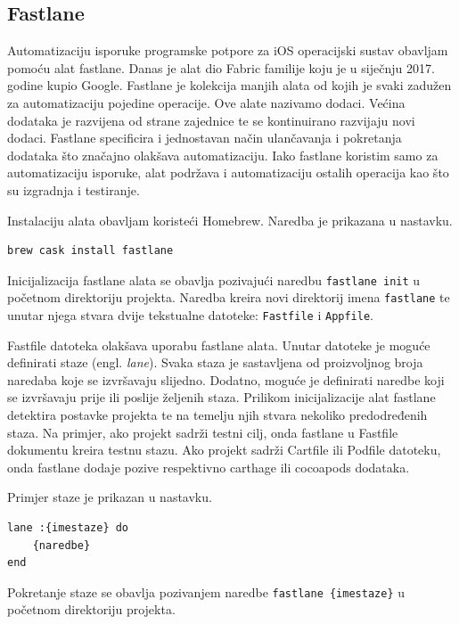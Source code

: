 \documentclass[times, utf8, diplomski, numeric]{fer}
\newcommand{\eng}[1]{(engl. \textit{#1})}
\begin{document}
\begin{appendices}
\chapter{Fastlane} \label{header:dodatak_fastlane}

Automatizaciju isporuke programske potpore za iOS operacijski sustav obavljam pomoću alat fastlane. Danas je alat dio Fabric familije koju je u siječnju 2017. godine kupio Google. Fastlane je kolekcija manjih alata od kojih je svaki zadužen za automatizaciju pojedine operacije. Ove alate nazivamo dodaci. Većina dodataka je razvijena od strane zajednice te se kontinuirano razvijaju novi dodaci. Fastlane specificira i jednostavan način ulančavanja i pokretanja dodataka što značajno olakšava automatizaciju. Iako fastlane koristim samo za automatizaciju isporuke, alat podržava i automatizaciju ostalih operacija kao što su izgradnja i testiranje\citep{fastlane}.

Instalaciju alata obavljam koristeći Homebrew. Naredba je prikazana u nastavku.

\begin{verbatim}
brew cask install fastlane
\end{verbatim}

Inicijalizacija fastlane alata se obavlja pozivajući naredbu \verb|fastlane init| u početnom direktoriju projekta. Naredba kreira novi direktorij imena \verb|fastlane| te unutar njega stvara dvije tekstualne datoteke: \verb|Fastfile| i \verb|Appfile|.

Fastfile datoteka olakšava uporabu fastlane alata. Unutar datoteke je moguće definirati staze \eng{lane}. Svaka staza je sastavljena od proizvoljnog broja naredaba koje se izvršavaju slijedno. Dodatno, moguće je definirati naredbe koji se izvršavaju prije ili poslije željenih staza. Prilikom inicijalizacije alat fastlane detektira postavke projekta te na temelju njih stvara nekoliko predodređenih staza. Na primjer, ako projekt sadrži testni cilj, onda fastlane u Fastfile dokumentu kreira testnu stazu. Ako projekt sadrži Cartfile ili Podfile datoteku, onda fastlane dodaje pozive respektivno carthage ili cocoapods dodataka.

Primjer staze je prikazan u nastavku.

\begin{verbatim}
lane :{imestaze} do
    {naredbe}
end
\end{verbatim}

Pokretanje staze se obavlja pozivanjem naredbe \verb|fastlane {imestaze}| u početnom direktoriju projekta.


\end{appendices}
\end{document}
